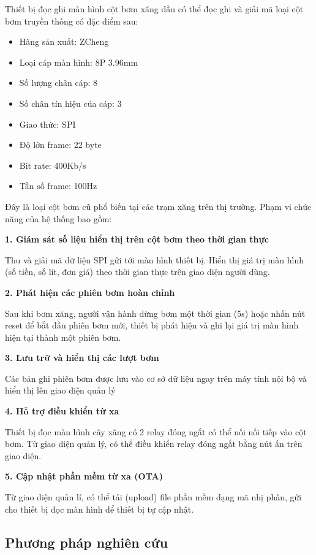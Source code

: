 \hspace{1cm} Thiết bị đọc ghi màn hình cột bơm xăng dầu có thể đọc ghi và giải mã loại cột bơm truyền thống có đặc điểm sau:
\begin{itemize}
   \item Hãng sản xuất: ZCheng
   \item Loại cáp màn hình: 8P 3.96mm
   \item Số lượng chân cáp: 8
   \item Số chân tín hiệu của cáp: 3
   \item Giao thức: SPI
   \item Độ lớn frame: 22 byte
   \item Bit rate: 400Kb/s
   \item Tần số frame: 100Hz
\end{itemize}
Đây là loại cột bơm cũ phổ biến tại các trạm xăng trên thị trường. Phạm vi chức năng của hệ thống bao gồm:

 \textbf{1. \quad Giám sát số liệu hiển thị trên cột bơm theo thời gian thực}

 Thu và giải mã dữ liệu SPI gửi tới màn hình thiết bị. Hiển thị giá trị màn hình (số tiền, số lít, đơn giá) theo thời gian thực trên giao diện người dùng.

  \textbf{
    2. \quad  Phát hiện các phiên bơm hoàn chỉnh
 }

 Sau khi bơm xăng, người vận hành dừng bơm một thời gian (5s) hoặc nhấn nút reset để bắt đầu phiên bơm mới, thiết bị phát hiện và ghi lại giá trị màn hình hiện tại thành một phiên bơm.

  \textbf{
    3. \quad Lưu trữ và hiển thị các lượt bơm
 }

 Các bản ghi phiên bơm được lưu vào cơ sở dữ liệu ngay trên máy tính nội bộ và hiển thị lên giao diện quản lý

 \textbf{
    4. \quad Hỗ trợ điều khiển từ xa
 }

Thiết bị đọc màn hình cây xăng có 2 relay đóng ngắt có thể nối nối tiếp vào cột bơm. Từ giao diện quản lý, có thể điều khiển relay đóng ngắt bằng nút ấn trên giao diện.


 \textbf{
    5. \quad Cập nhật phần mềm từ xa (OTA)
 }

 Từ giao diện quản lí, có thể tải (upload) file phần mềm dạng mã nhị phân, gửi cho thiết bị đọc màn hình để thiết bị tự cập nhật. 

\subsection{Phương pháp nghiên cứu}

